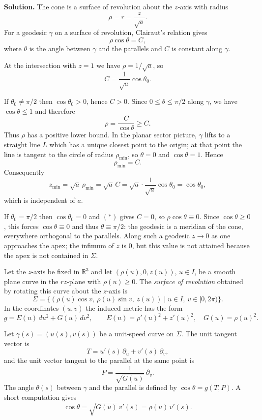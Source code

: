\begin{solution}
\medskip
\textbf{Solution.}
The cone is a surface of revolution about the $z$-axis with radius
\[
\rho = r = \frac{z}{\sqrt{a}}.
\]
For a geodesic $\gamma$ on a surface of revolution, Clairaut's relation
gives
\[
\rho\cos\theta = C,
\]
where $\theta$ is the angle between $\gamma$ and the parallels and $C$ is
constant along $\gamma$.

At the intersection with $z=1$ we have $\rho = 1/\sqrt{a}$, so
\[
C = \frac{1}{\sqrt{a}}\cos\theta_0.
\tag{$*$}
\]

If $\theta_0\neq\pi/2$ then $\cos\theta_0>0$, hence $C>0$. Since
$0\le\theta\le\pi/2$ along $\gamma$, we have $\cos\theta\le1$ and therefore
\[
\rho = \frac{C}{\cos\theta} \ge C.
\]
Thus $\rho$ has a positive lower bound. In the planar sector picture,
$\gamma$ lifts to a straight line $L$ which has a unique closest point to
the origin; at that point the line is tangent to the circle of radius
$\rho_{\min}$, so $\theta=0$ and $\cos\theta=1$. Hence
\[
\rho_{\min} = C.
\]
Consequently
\[
z_{\min} = \sqrt{a}\,\rho_{\min}
= \sqrt{a}\,C
= \sqrt{a}\cdot\frac{1}{\sqrt{a}}\cos\theta_0
= \cos\theta_0,
\]
which is independent of $a$.

If $\theta_0=\pi/2$ then $\cos\theta_0=0$ and $(*)$ gives $C=0$, so
$\rho\cos\theta\equiv0$. Since $\cos\theta\ge0$, this forces
$\cos\theta\equiv0$ and thus $\theta\equiv\pi/2$: the geodesic is a meridian
of the cone, everywhere orthogonal to the parallels. Along such a geodesic
$z\to0$ as one approaches the apex; the infimum of $z$ is $0$, but this
value is not attained because the apex is not contained in $\Sigma$.
	
	
	
\begin{definition}
	Let the $z$-axis be fixed in $\mathbb R^3$ and let
	$(\rho(u),0,z(u))$, $u\in I$, be a smooth plane curve in the $rz$-plane
	with $\rho(u)\ge 0$. The \emph{surface of revolution} obtained by rotating
	this curve about the $z$-axis is
	\[
	\Sigma = \{(\rho(u)\cos v,\ \rho(u)\sin v,\ z(u)) \mid u\in I,\ v\in[0,2\pi)\}.
	\]
	In the coordinates $(u,v)$ the induced metric has the form
	\[
	g = E(u)\,du^2 + G(u)\,dv^2,\qquad
	E(u)=\rho'(u)^2+z'(u)^2,\quad G(u)=\rho(u)^2.
	\]
\end{definition}

\begin{definition}
	Let $\gamma(s)=(u(s),v(s))$ be a unit-speed curve on $\Sigma$.
	The unit tangent vector is
	\[
	T = u'(s)\,\partial_u + v'(s)\,\partial_v,
	\]
	and the unit vector tangent to the parallel at the same point is
	\[
	P = \frac{1}{\sqrt{G(u)}}\,\partial_v.
	\]
	The angle $\theta(s)$ between $\gamma$ and the parallel is defined by
	$\cos\theta = g(T,P)$. A short computation gives
	\[
	\cos\theta = \sqrt{G(u)}\,v'(s) = \rho(u)\,v'(s).
	\]
\end{definition}


\end{solution}
